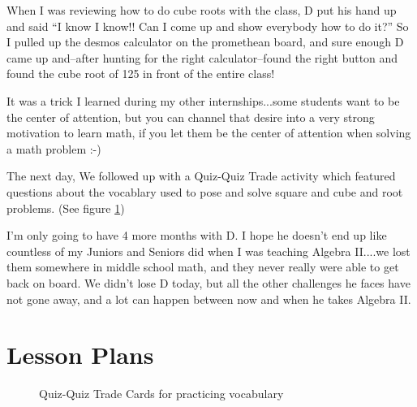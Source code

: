 \documentclass[11pt]{elegantbook}
\begin{document}
When I was reviewing how to do cube roots with the class, D put his
hand up and said ``I know I know!!  Can I come up and show everybody
how to do it?''  So I pulled up the desmos calculator on the
promethean board, and sure enough D came up and--after hunting for the
right calculator--found the right button and found the cube root of
125 in front of the entire class!

It was a trick I learned during my other internships...some students
want to be the center of attention, but you can channel that desire
into a very strong motivation to learn math, if you let them be the
center of attention when solving a math problem :-)

The next day, We followed up with a Quiz-Quiz Trade activity
which featured questions about the vocablary used to pose and solve
square and cube and root problems. (See figure \ref{qqt_root})

I'm only going to have 4 more months with D.  I hope he doesn't end up
like countless of my Juniors and Seniors did when I was teaching
Algebra II....we lost them somewhere in middle school math, and they
never really were able to get back on board.  We didn't lose D today,
but all the other challenges he faces have not gone away, and a lot
can happen between now and when he takes Algebra II.

\section{Lesson Plans}










\begin{figure}[h]
  \begin{minipage}[t]{5in}
    
    \caption{Quiz-Quiz Trade Cards for practicing vocabulary}
  \end{minipage}
  \label{qqt_root}
\end{figure}


\end{document}
